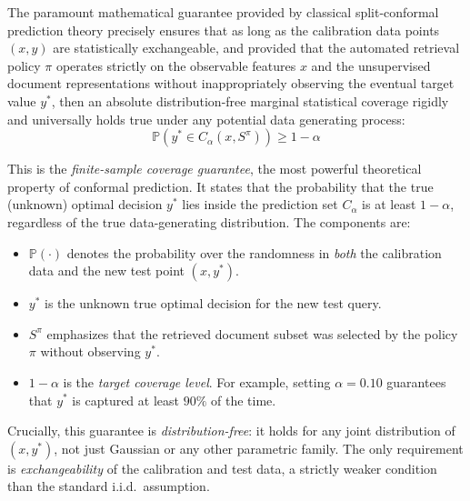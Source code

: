 \documentclass[12pt,a4paper,oneside]{report}
\theoremstyle{definition}
\theoremstyle{remark}
\begin{document}
The paramount mathematical guarantee provided by classical split-conformal prediction theory precisely ensures that as long as the calibration data points $(x,y)$ are statistically exchangeable, and provided that the automated retrieval policy $\pi$ operates strictly on the observable features $x$ and the unsupervised document representations without inappropriately observing the eventual target value $y^*$, then an absolute distribution-free marginal statistical coverage rigidly and universally holds true under any potential data generating process:
\begin{equation} \label{eq:coverage_guarantee}
\mathbb{P}\left(y^* \in C_{\alpha}(x, S^\pi)\right) \geq 1 - \alpha
\end{equation}

\medskip
\noindent This is the \emph{finite-sample coverage guarantee}, the most powerful theoretical property of conformal prediction. It states that the probability that the true (unknown) optimal decision $y^*$ lies inside the prediction set $C_{\alpha}$ is at least $1 - \alpha$, regardless of the true data-generating distribution. The components are:

\begin{itemize}[leftmargin=2em]
  \item $\mathbb{P}(\cdot)$ denotes the probability over the randomness in \emph{both} the calibration data and the new test point $(x, y^*)$.
  \item $y^*$ is the unknown true optimal decision for the new test query.
  \item $S^\pi$ emphasizes that the retrieved document subset was selected by the policy $\pi$ without observing $y^*$.
  \item $1 - \alpha$ is the \emph{target coverage level}. For example, setting $\alpha = 0.10$ guarantees that $y^*$ is captured at least $90\%$ of the time.
\end{itemize}

\noindent Crucially, this guarantee is \emph{distribution-free}: it holds for any joint distribution of $(x, y^*)$, not just Gaussian or any other parametric family. The only requirement is \emph{exchangeability} of the calibration and test data, a strictly weaker condition than the standard i.i.d.\ assumption.
\end{document}
